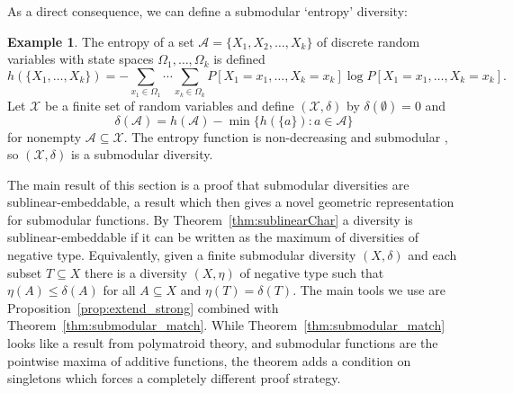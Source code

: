 \documentclass{article}
\theoremstyle{plain}
\theoremstyle{definition}
\newtheorem{example}[theorem]{Example}
\begin{document}
As a direct consequence, we can define a submodular `entropy' diversity:

\begin{example}
The entropy of a set $\mathcal{A} = \{X_1,X_2,\ldots,X_k\}$ of discrete random variables  with state spaces $\Omega_1,\ldots,\Omega_k$ is defined
\[h(\{X_1,\ldots,X_k\}) = -\sum_{x_1 \in \Omega_1} \cdots \sum_{x_k \in \Omega_k} P[X_1 = x_1,\ldots,X_k = x_k] \log P[X_1 = x_1,\ldots,X_k = x_k] .\]
Let $\mathcal{X}$ be a finite set of random variables and define $(\mathcal{X},\delta)$ by $\delta(\emptyset) = 0$ and
\[\delta(\mathcal{A}) = h(\mathcal{A}) - \min\{h(\{a\}): a \in \mathcal{A}\}\]
for nonempty $\mathcal{A} \subseteq \mathcal{X}$. The entropy function is non-decreasing and submodular \cite{Fujishige1978}, so $(\mathcal{X},\delta)$ is a submodular diversity.
\end{example}

The main result of this section is a proof that submodular diversities are sublinear-embeddable, a result which then gives a novel geometric representation for submodular functions. By Theorem~\ref{thm:sublinearChar} a diversity is sublinear-embeddable if it can be written as the maximum of diversities of negative type. Equivalently, given a finite submodular diversity $(X,\delta)$ and each subset $T \subseteq X$ there is a diversity $(X,\eta)$ of negative type such that $\eta(A) \leq \delta(A)$ for all $A \subseteq X$ and $\eta(T) = \delta(T)$.  The main tools we use are Proposition~\ref{prop:extend_strong} combined with Theorem~\ref{thm:submodular_match}. While Theorem~\ref{thm:submodular_match} looks like a result from polymatroid theory, and submodular functions are the pointwise maxima of additive functions, the theorem adds a condition on singletons which forces a completely different proof strategy.
\end{document}
